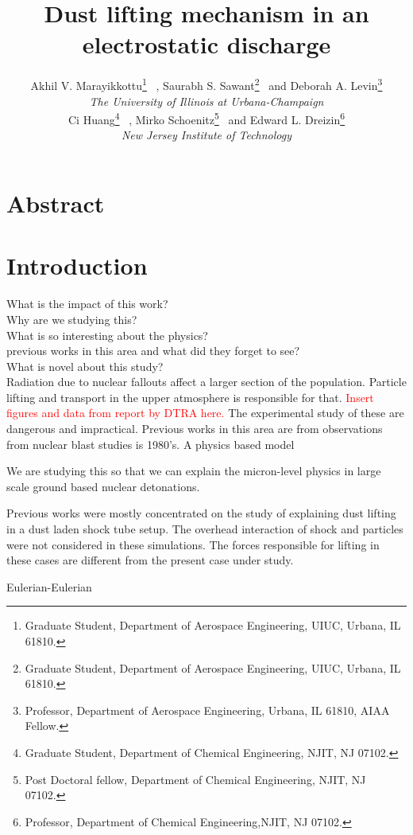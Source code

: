 \documentclass[12pt]{aiaa-tc}
\title{Dust lifting mechanism in an electrostatic discharge}
\author{Akhil V. Marayikkottu\thanks{Graduate Student, Department of Aerospace Engineering, UIUC, Urbana, IL 61810.} ~,
	 Saurabh S. Sawant\thanks{Graduate Student, Department of Aerospace Engineering, UIUC, Urbana, IL 61810.} ~and
  Deborah A. Levin\thanks{Professor, Department of Aerospace Engineering, Urbana, IL 61810, AIAA Fellow.}\\
  {\it The University of Illinois at Urbana-Champaign}\\
   Ci Huang\thanks{Graduate Student, Department of Chemical Engineering, NJIT, NJ 07102.} ~,
	Mirko Schoenitz\thanks{Post Doctoral  fellow, Department of Chemical Engineering, NJIT, NJ 07102. } ~and
	Edward L. Dreizin\thanks{Professor, Department of Chemical Engineering,NJIT, NJ 07102. }\\
	{\it New Jersey Institute of Technology}}
\begin{document}
\maketitle

\textcolor{red}{\tableofcontents}
\newpage
\section{Abstract}
\newpage
\section{Introduction}
What is the impact of this work?\\
Why are we studying this?\\
What is so interesting about the physics?\\
previous works in this area and what did they forget to see?\\
What is novel about this study?\\

Radiation due to nuclear fallouts affect a larger section of the population.  Particle lifting and transport in the upper atmosphere is responsible for that. \textcolor{red}{Insert figures and data from report by DTRA here.} The experimental study of these are dangerous and impractical. Previous works in this area are from observations from nuclear blast studies is 1980's. A physics based model 

We are studying this so that we can explain the micron-level physics in large scale ground based nuclear detonations. 

Previous works were mostly concentrated on the study of explaining dust lifting in a dust laden shock tube setup. The overhead interaction of shock and particles were not considered in these simulations. The forces responsible for lifting in these cases are different from the present case under study. 

Eulerian-Eulerian
\end{document}

